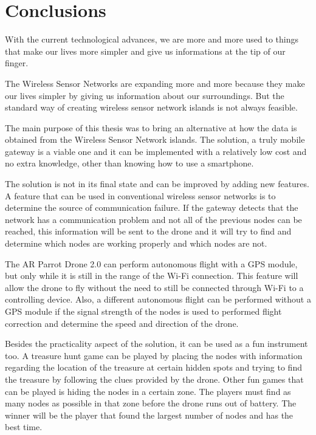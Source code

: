 \chapter{Conclusions}

With the current technological advances, we are more and more used to things that make our lives more simpler and give us informations at the tip of our finger. 

The Wireless Sensor Networks are expanding more and more because they make our lives simpler by giving us information about our surroundings. But the standard way of creating wireless sensor network islands is not always feasible.

The main purpose of this thesis was to bring an alternative at how the data is obtained from the Wireless Sensor Network islands. The solution, a truly mobile gateway is a viable one and it can be implemented with a relatively low cost and no extra knowledge, other than knowing how to use a smartphone.

The solution is not in its final state and can be improved by adding new features. A feature that can be used in conventional wireless sensor networks is to determine the source of communication failure. If the gateway detects that the network has a communication problem and not all of the previous nodes can be reached, this information will be sent to the drone and it will try to find and determine which nodes are working properly and which nodes are not.
 
The AR Parrot Drone 2.0 can perform autonomous flight with a GPS module, but only while it is still in the range of the Wi-Fi connection. This feature will allow the drone to fly without the need to still be connected through Wi-Fi to a controlling device. Also, a different autonomous flight can be performed without a GPS module if the signal strength of the nodes is used to performed flight correction and determine the speed and direction of the drone.


Besides the practicality aspect of the solution, it can be used as a fun instrument too. A treasure hunt game can be played by placing the nodes with information regarding the location of the treasure at certain hidden spots and trying to find the treasure by following the clues provided by the drone. Other fun games that can be played is hiding the nodes in a certain zone. The players must find as many nodes as possible in that zone before the drone runs out of battery. The winner will be the player that found the largest number of nodes and has the best time.
